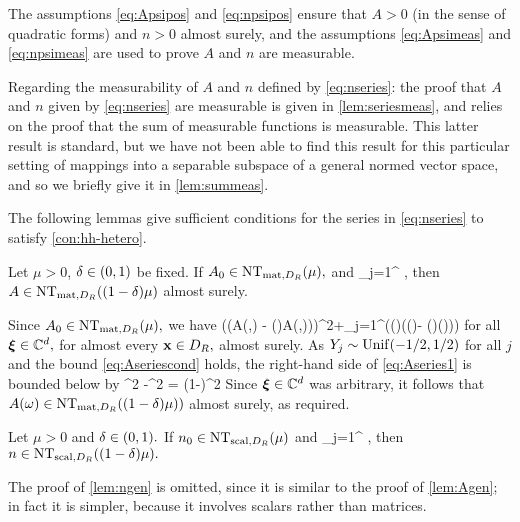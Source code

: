 The assumptions \eqref{eq:Apsipos} and \eqref{eq:npsipos} ensure that $A > 0$ (in the sense of quadratic forms) and $n > 0$  almost surely, and the assumptions \eqref{eq:Apsimeas} and \eqref{eq:npsimeas} are used to prove $A$ and $n$ are measurable.

Regarding the measurability of $A$ and $n$ defined by \eqref{eq:nseries}: the proof that $A$ and $n$ given by \eqref{eq:nseries} are measurable is given in \cref{lem:seriesmeas}, and relies on the proof that the sum of measurable functions
is measurable. This latter result is standard, but we have not been able to find this result for this particular setting of mappings
into a separable subspace of a general normed vector space, and so we briefly give it in \cref{lem:summeas}. 

The following lemmas give sufficient conditions for the series in \eqref{eq:nseries} to satisfy \cref{con:hh-hetero}.

\label{lem:Agen}
Let $\mu > 0$, $\delta \in \mleft(0,1\mright)$ be fixed. If $\Az \in \NTA{\mu},$ and
\beq\label{eq:Aseriescond}
\sum_{j=1}^\infty \sqrt{\Lambdaj}\NLiDRop{\Psij(\bx) - \mleft(\bx\cdot\grad\mright)\Psij(\bx)} \delta\mu,
\eeq
then $A \in \NTA{(1-\delta)\mu}$ almost surely.
\ele

Since $\Az \in \NTA{\mu},$ we have 
\beq\label{eq:Aseries1}
\Big(\mleft(A(\omega,\bx) - \mleft(\bx\cdot\grad\mright)A(\omega,\bx)\mright)\bxi\Big)\cdot\bxib \geq\mu \abs{\bxi}^2+\sum_{j=1}^\infty  \Big(\Yj(\omega)\sqrt{\Lambdaj}\mleft(\Psij(\bx)- \mleft(\bx\cdot\grad\mright)\Psij(\bx)\mright)\bxi\Big)\cdot\bxib
\eeq
for all $\boldsymbol{\xi} \in \mathbb C^{d},$ for almost every $\mathbf{x} \in D_{R},$ almost surely. As $Y_{j} \sim \mathrm{Unif}(-1/2,1/2)$ for all $j$ and the bound \eqref{eq:Aseriescond} holds, the right-hand side of \eqref{eq:Aseries1} is bounded below by
\beqs
\mu \abs{\bxi}^2 -\delta \mu \abs{\bxi}^2 = (1-\delta)\mu\abs{\bxi}^2
\eeqs
Since $\boldsymbol{\xi} \in \mathbb C^{d}$ was arbitrary, it follows that $A(\omega) \in \NTA{(1-\delta)\mu)}$ almost surely, as required.
\epf

\label{lem:ngen}
Let $\mu > 0$ and $\delta \in \mleft(0,1\mright).$ If $\nz \in \NTn{\mu}$ and
\beq\label{eq:nseriescond}
\sum_{j=1}^\infty\sqrt{\lambdaj}\NLiDRRR{\psij(\bx) + \bx\cdot\grad\psij(\bx)} \delta\mu,
\eeq
then $n \in \NTn{(1-\delta)\mu}.$
\ele

The proof of \cref{lem:ngen} is omitted, since it is similar to the proof of \cref{lem:Agen}; in fact it is simpler, because it involves scalars rather than matrices.
